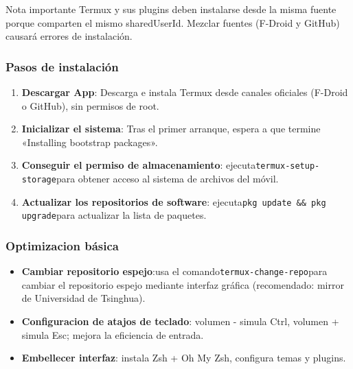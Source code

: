 \begin{tcbwarn}{Nota importante}
Termux y sus plugins deben instalarse desde la misma fuente porque comparten el mismo sharedUserId. Mezclar fuentes (F-Droid y GitHub) causará errores de instalación.

\end{tcbwarn}


\subsubsection*{Pasos de instalación}

\begin{enumerate}
  \item \textbf{Descargar App}: Descarga e instala Termux desde canales oficiales (F-Droid o GitHub), sin permisos de root.
  \item \textbf{Inicializar el sistema}: Tras el primer arranque, espera a que termine «Installing bootstrap packages».
  \item \textbf{Conseguir el permiso de almacenamiento}: ejecuta\texttt{termux-\allowbreak setup-\allowbreak storage}para obtener acceso al sistema de archivos del móvil.
  \item \textbf{Actualizar los repositorios de software}: ejecuta\texttt{pkg update \&\& pkg upgrade}para actualizar la lista de paquetes.
\end{enumerate}

\subsubsection*{Optimizacion básica}

\begin{itemize}
  \item \textbf{Cambiar repositorio espejo}:usa el comando\texttt{termux-\allowbreak change-\allowbreak repo}para cambiar el repositorio espejo mediante interfaz gráfica (recomendado: mirror de Universidad de Tsinghua).
  \item \textbf{Configuracion de atajos de teclado}: volumen - simula Ctrl, volumen + simula Esc; mejora la eficiencia de entrada.
  \item \textbf{Embellecer interfaz}: instala Zsh + Oh My Zsh, configura temas y plugins.
\end{itemize}


